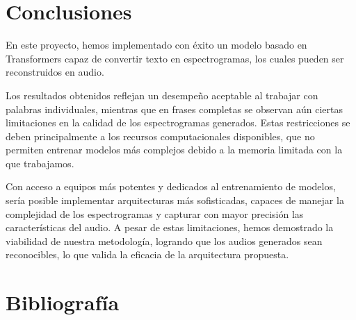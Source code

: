 \documentclass{article}
\begin{document}
\section{\Huge Conclusiones}
\begin{Large}
\vspace{0.5cm}

En este proyecto, hemos implementado con éxito un modelo basado en Transformers capaz de convertir texto en espectrogramas, los cuales pueden ser reconstruidos en audio.

Los resultados obtenidos reflejan un desempeño aceptable al trabajar con palabras individuales, mientras que en frases completas se observan aún ciertas limitaciones en la calidad de los espectrogramas generados. Estas restricciones se deben principalmente a los recursos computacionales disponibles, que no permiten entrenar modelos más complejos debido a la memoria limitada con la que trabajamos.

Con acceso a equipos más potentes y dedicados al entrenamiento de modelos, sería posible implementar arquitecturas más sofisticadas, capaces de manejar la complejidad de los espectrogramas y capturar con mayor precisión las características del audio. A pesar de estas limitaciones, hemos demostrado la viabilidad de nuestra metodología, logrando que los audios generados sean reconocibles, lo que valida la eficacia de la arquitectura propuesta.


\end{Large}
\vspace{2cm}
\section{\Huge Bibliografía}
\vspace{2cm}
\end{document}
